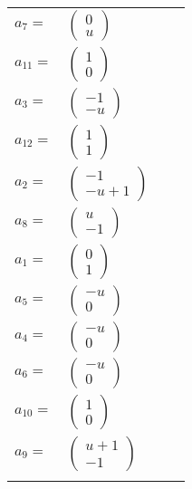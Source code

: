 \documentclass[1p]{elsarticle_modified}
\theoremstyle{definition}
\begin{document}
\begin{tabular}{m{7pt} m{180pt} m{7pt} m{180pt} }
\flushright $a_{7}=$&$\begin{pmatrix}0\\u\end{pmatrix}$ \\
\flushright $a_{11}=$&$\begin{pmatrix}1\\0\end{pmatrix}$ \\
\flushright $a_{3}=$&$\begin{pmatrix}-1\\- u\end{pmatrix}$ \\
\flushright $a_{12}=$&$\begin{pmatrix}1\\1\end{pmatrix}$ \\
\flushright $a_{2}=$&$\begin{pmatrix}-1\\- u+1\end{pmatrix}$ \\
\flushright $a_{8}=$&$\begin{pmatrix}u\\-1\end{pmatrix}$ \\
\flushright $a_{1}=$&$\begin{pmatrix}0\\1\end{pmatrix}$ \\
\flushright $a_{5}=$&$\begin{pmatrix}- u\\0\end{pmatrix}$ \\
\flushright $a_{4}=$&$\begin{pmatrix}- u\\0\end{pmatrix}$ \\
\flushright $a_{6}=$&$\begin{pmatrix}- u\\0\end{pmatrix}$ \\
\flushright $a_{10}=$&$\begin{pmatrix}1\\0\end{pmatrix}$ \\
\flushright $a_{9}=$&$\begin{pmatrix}u+1\\-1\end{pmatrix}$\\&\end{tabular}
\end{document}
